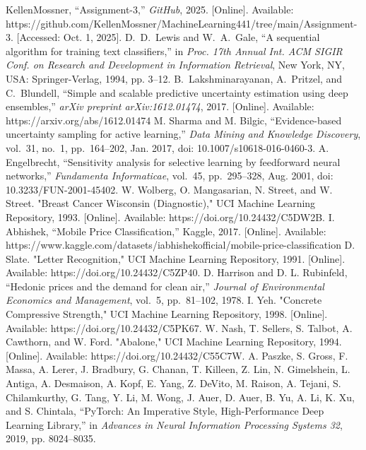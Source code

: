 \documentclass[conference]{IEEEtran}
\begin{document}
	
	\begin{thebibliography}{00}
		 KellenMossner, ``Assignment-3,'' \textit{GitHub}, 2025. [Online]. Available: https://github.com/KellenMossner/MachineLearning441/tree/main/Assignment-3. [Accessed: Oct. 1, 2025].
		 D.~D.~Lewis and W.~A.~Gale, ``A sequential algorithm for training text classifiers,'' in \emph{Proc. 17th Annual Int. ACM SIGIR Conf. on Research and Development in Information Retrieval}, New York, NY, USA: Springer-Verlag, 1994, pp. 3--12.
		 B.~Lakshminarayanan, A.~Pritzel, and C.~Blundell, ``Simple and scalable predictive uncertainty estimation using deep ensembles,'' \emph{arXiv preprint arXiv:1612.01474}, 2017. [Online]. Available: https://arxiv.org/abs/1612.01474
		 M. Sharma and M. Bilgic, ``Evidence-based uncertainty sampling for active learning,'' \emph{Data Mining and Knowledge Discovery}, vol.~31, no.~1, pp.~164--202, Jan. 2017, doi: 10.1007/s10618-016-0460-3.
		 A. Engelbrecht, ``Sensitivity analysis for selective learning by feedforward neural networks,'' \emph{Fundamenta Informaticae}, vol.~45, pp.~295--328, Aug. 2001, doi: 10.3233/FUN-2001-45402.
		 W. Wolberg, O. Mangasarian, N. Street, and W. Street. "Breast Cancer Wisconsin (Diagnostic)," UCI Machine Learning Repository, 1993. [Online]. Available: https://doi.org/10.24432/C5DW2B.
		 I. Abhishek, ``Mobile Price Classification,'' Kaggle, 2017. [Online]. Available: https://www.kaggle.com/datasets/iabhishekofficial/mobile-price-classification
		 D. Slate. "Letter Recognition," UCI Machine Learning Repository, 1991. [Online]. Available: https://doi.org/10.24432/C5ZP40.
		 D. Harrison and D. L. Rubinfeld, ``Hedonic prices and the demand for clean air,'' \emph{Journal of Environmental Economics and Management}, vol.~5, pp.~81--102, 1978.
		 I. Yeh. "Concrete Compressive Strength," UCI Machine Learning Repository, 1998. [Online]. Available: https://doi.org/10.24432/C5PK67.
		 W. Nash, T. Sellers, S. Talbot, A. Cawthorn, and W. Ford. "Abalone," UCI Machine Learning Repository, 1994. [Online]. Available: https://doi.org/10.24432/C55C7W.
			A. Paszke, S. Gross, F. Massa, A. Lerer, J. Bradbury, G. Chanan, T. Killeen, Z. Lin, N. Gimelshein, L. Antiga, A. Desmaison, A. Kopf, E. Yang, Z. DeVito, M. Raison, A. Tejani, S. Chilamkurthy, G. Tang, Y. Li, M. Wong, J. Auer, D. Auer, B. Yu, A. Li, K. Xu, and S. Chintala, ``PyTorch: An Imperative Style, High-Performance Deep Learning Library,'' in \textit{Advances in Neural Information Processing Systems 32}, 2019, pp. 8024--8035.
	\end{thebibliography}
	
\end{document}
